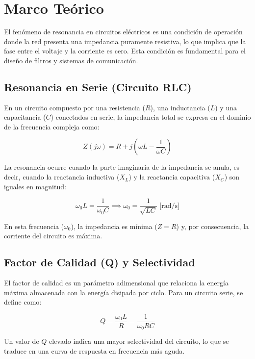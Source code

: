 \section{Marco Teórico}

El fenómeno de resonancia en circuitos eléctricos es una condición de operación donde la red presenta una impedancia puramente resistiva, lo que implica que la fase entre el voltaje y la corriente es cero. Esta condición es fundamental para el diseño de filtros y sistemas de comunicación.

\subsection{Resonancia en Serie (Circuito RLC)}

En un circuito compuesto por una resistencia ($R$), una inductancia ($L$) y una capacitancia ($C$) conectados en serie, la impedancia total se expresa en el dominio de la frecuencia compleja como:

\begin{equation}
	Z(j\omega) = R + j\left(\omega L - \frac{1}{\omega C}\right)
\end{equation}

La resonancia ocurre cuando la parte imaginaria de la impedancia se anula, es decir, cuando la reactancia inductiva ($X_L$) y la reactancia capacitiva ($X_C$) son iguales en magnitud:

\begin{equation}
	\omega_0 L = \frac{1}{\omega_0 C} \implies \omega_0 = \frac{1}{\sqrt{LC}} \text{ [rad/s]}
\end{equation}

En esta frecuencia ($\omega_0$), la impedancia es mínima ($Z = R$) y, por consecuencia, la corriente del circuito es máxima.

\subsection{Factor de Calidad (Q) y Selectividad}

El factor de calidad es un parámetro adimensional que relaciona la energía máxima almacenada con la energía disipada por ciclo. Para un circuito serie, se define como:

\begin{equation}
	Q = \frac{\omega_0 L}{R} = \frac{1}{\omega_0 RC}
\end{equation}

Un valor de $Q$ elevado indica una mayor selectividad del circuito, lo que se traduce en una curva de respuesta en frecuencia más aguda.

